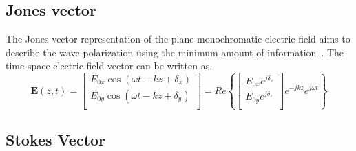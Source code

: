 \subsection{Jones vector}
The Jones vector representation of the plane monochromatic electric field aims to describe the wave polarization using the minimum amount of information~\citep{azzam1977ellipsometry,luneburg1996radar}. The time-space electric field vector can be written as,     
\begin{equation}
\mathbf{E}(z,t)=
\left[\begin{array}{c}
E_{0x}\cos(\omega t-kz+\delta_{x})\\
E_{0y}\cos(\omega t-kz+\delta_{y})\\
\end{array}\right]=Re\left\{
\left[
\begin{array}{c}
E_{0x}e^{j\delta_{x}}\\
E_{0y}e^{ j\delta_{x}}\\
\end{array}
\right]e^{-jkz}e^{j\omega t}
\right\}
\end{equation}

\subsection{Stokes Vector}

